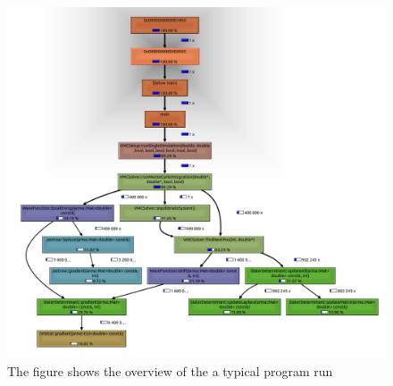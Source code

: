 \documentclass[aps,prc,twocolumn,floatfix]{revtex4}
\begin{document}
\begin{appendices}
\begin{widetext}
\begin{figure}
\centering
\includegraphics[width=17cm]{figures/programview.png}
\caption{\label{fig:11} The figure shows the overview of the a typical program run}
\end{figure}
\end{widetext}
 
 

\end{appendices}
\end{document}

